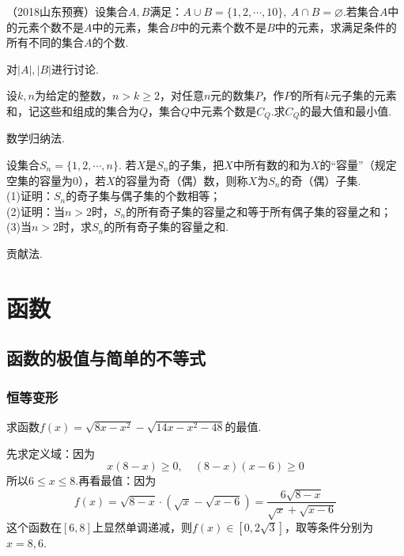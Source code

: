 \documentclass[cn,hazy,black,10pt,normal]{elegantnote}
\begin{document}
\begin{problem} %
	（2018山东预赛）设集合$A,B$满足：$A \cup B = \{ 1,2,\cdots ,10 \}, ~A \cap B = \varnothing$.若集合$A$中的元素个数不是$A$中的元素，集合$B$中的元素个数不是$B$中的元素，求满足条件的所有不同的集合$A$的个数.
\end{problem}
\begin{hint}
	对$|A|,|B|$进行讨论.
\end{hint}

\begin{problem} %
	设$k,n$为给定的整数，$n>k \geq 2$，对任意$n$元的数集$P$，作$P$的所有$k$元子集的元素和，记这些和组成的集合为$Q$，集合$Q$中元素个数是$C_Q$.求$C_Q$的最大值和最小值.
\end{problem}
\begin{hint}
	数学归纳法.
\end{hint}

\begin{problem} %
	设集合$S_n=\{1,2, \cdots ,n\}$. 若$X$是$S_n$的子集，把$X$中所有数的和为$X$的“容量”（规定空集的容量为$0$），若$X$的容量为奇（偶）数，则称$X$为$S_n$的奇（偶）子集. \\
    (1)证明：$S_n$的奇子集与偶子集的个数相等；\\
    (2)证明：当$n>2$时，$S_n$的所有奇子集的容量之和等于所有偶子集的容量之和；\\
    (3)当$n>2$时，求$S_n$的所有奇子集的容量之和.
\end{problem}
\begin{hint}
	贡献法.
\end{hint}
 
\chapter{函数}

\section{函数的极值与简单的不等式}

\subsection{恒等变形}

\begin{problem} %
	求函数$f(x)=\sqrt{8x-x^2}-\sqrt{14x-x^2-48}$的最值.
\end{problem}
\begin{solution}
	先求定义域：因为$$x(8-x) \geq 0, \quad (8-x)(x-6) \geq 0$$
	所以$6 \leq x \leq 8$.再看最值：因为$$f(x)=\sqrt{8-x} \cdot (\sqrt{x} - \sqrt{x-6}) = \frac{6\sqrt{8-x}}{\sqrt{x} + \sqrt{x-6}}$$
	这个函数在$[6,8]$上显然单调递减，则$f(x) \in [0,2\sqrt{3}]$，取等条件分别为$x=8,6$.
\end{solution}
\end{document}
